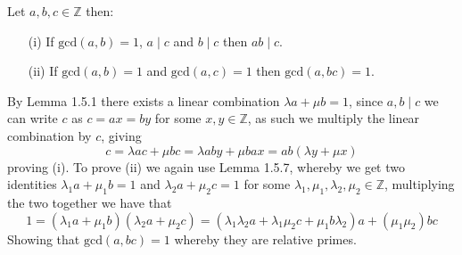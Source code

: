 \begin{coro}
    Let $a,b,c\in\mathbb{Z}$ then:
    \begin{itemize}
        \item[(i)] If $\text{gcd}(a,b)=1$, $a\mid c$ and $b\mid c$ then $ab\mid c$.
        \item[(ii)] If $\text{gcd}(a,b)=1$ and $\text{gcd}(a,c)=1$ then $\text{gcd}(a,bc)=1$.
    \end{itemize}
\end{coro}
\begin{prf}
    By Lemma 1.5.1 there exists a linear combination $\lambda a+\mu b=1$, since $a,b\mid c$ we can write $c$ as $c=ax=by$ for some $x,y\in\mathbb{Z}$, as such we multiply the linear combination by $c$, giving
    \[
        c=\lambda ac+\mu bc=\lambda aby+\mu bax=ab(\lambda y+\mu x)
    \]
    proving (i). To prove (ii) we again use Lemma 1.5.7, whereby we get two identities $\lambda_{1}a+\mu_{1}b=1$ and $\lambda_{2}a+\mu_{2}c=1$ for some $\lambda_{1},\mu_{1},\lambda_{2},\mu_{2}\in\mathbb{Z}$,  multiplying the two together we have that
    \[
        1=(\lambda_{1}a+\mu_{1}b)(\lambda_{2}a+\mu_{2}c)=(\lambda_{1}\lambda_{2}a+\lambda_{1}\mu_{2}c+\mu_{1}b\lambda_{2})a+(\mu_{1}\mu_{2})bc
    \]
    Showing that $\text{gcd}(a,bc)=1$ whereby they are relative primes.
\end{prf}
